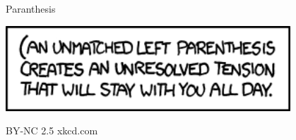 \documentclass[a6paper,fontsize=10pt,twoside,open=right]{scrbook}
\begin{document}
\newpage

\newpage

\newpage

\vspace{15pt}

\newpage

\vspace{15pt}

\newpage

\vspace{15pt}

\newpage

\vspace{15pt}

\newpage

\newpage

\newpage

\vspace{15pt}

\newpage

\vspace{15pt}

\newpage

\newpage

\newpage

\newpage

\newpage

\vfill
{}
\begin{center}
  \tiny{Paranthesis}\par
  \vspace{5pt}
  \includegraphics[keepaspectratio,width=0.8\textwidth]{elements/images/paranthesis.png}\par
  \vspace{5pt}
  \tiny{BY-NC 2.5 xkcd.com}
\end{center}
\par
\vfill
\newpage

\vspace{15pt}

\newpage

\newpage

\vspace{15pt}

\newpage

\newpage

\newpage

\newpage

\vspace*{-10pt}
\newpage

\end{document}
